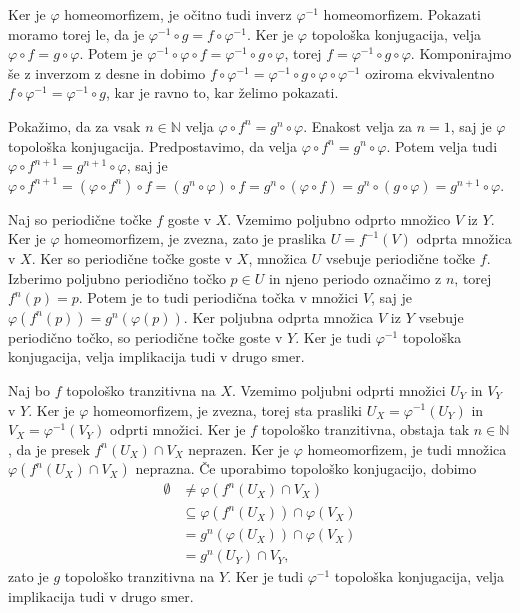 \documentclass{isrmdelo}
\newcommand{\N}{\mathbb N}
\begin{document}
\begin{dokaz}
Ker je $\varphi$ homeomorfizem, je očitno tudi inverz $\varphi^{-1}$ homeomorfizem. Pokazati moramo torej le, da je $\varphi^{-1} \circ g = f \circ \varphi^{-1}$. Ker je $\varphi$ topološka konjugacija, velja $\varphi \circ f = g \circ \varphi$. Potem je $\varphi^{-1} \circ \varphi \circ f = \varphi^{-1} \circ g \circ \varphi$, torej $f=\varphi^{-1} \circ g \circ \varphi$. Komponirajmo še z inverzom z desne in dobimo $f \circ \varphi^{-1} =\varphi^{-1} \circ g \circ \varphi \circ \varphi^{-1}$ oziroma ekvivalentno $f \circ \varphi^{-1} =\varphi^{-1} \circ g$, kar je ravno to, kar želimo pokazati.

\smallskip

Pokažimo, da za vsak $n \in \N$ velja $\varphi \circ f^n = g^n \circ \varphi$. Enakost velja za $n=1$, saj je $\varphi$ topološka konjugacija. Predpostavimo, da velja $\varphi \circ f^n = g^n \circ \varphi$. Potem velja tudi $\varphi \circ f^{n+1} = g^{n+1} \circ \varphi$, saj je $\varphi \circ f^{n+1} = (\varphi \circ f^n) \circ f = (g^n \circ \varphi) \circ f = g^n \circ (\varphi \circ f) = g^n \circ (g \circ \varphi) = g^{n+1} \circ \varphi.$

\smallskip

Naj so periodične točke $f$ goste v $X$. Vzemimo poljubno odprto množico $V$ iz $Y$. Ker je $\varphi$ homeomorfizem, je zvezna, zato je praslika $U=f^{-1}(V)$ odprta množica v $X$. Ker so periodične točke goste v $X$, množica $U$ vsebuje periodične točke $f$. Izberimo poljubno periodično točko $p \in U$ in njeno periodo označimo z $n$, torej $f^n(p) = p$. Potem je to tudi periodična točka v množici $V$, saj je $\varphi(f^n(p)) = g^n(\varphi(p))$. Ker poljubna odprta množica $V$ iz $Y$ vsebuje periodično točko, so periodične točke goste v $Y$. Ker je tudi $\varphi^{-1}$ topološka konjugacija, velja implikacija tudi v drugo smer.

\smallskip

Naj bo $f$ topološko tranzitivna na $X$. Vzemimo poljubni odprti množici $U_Y$ in $V_Y$ v $Y$. Ker je $\varphi$ homeomorfizem, je zvezna, torej sta prasliki $U_X = \varphi^{-1}(U_Y)$ in $V_X = \varphi^{-1}(V_Y)$ odprti množici. Ker je $f$ topološko tranzitivna, obstaja tak $n \in \N$, da je presek $f^n(U_X) \cap V_X$ neprazen. Ker je $\varphi$ homeomorfizem, je tudi množica $\varphi(f^n(U_X) \cap V_X)$ neprazna. Če uporabimo topološko konjugacijo, dobimo
\begin{align*}
    \emptyset &\neq \varphi(f^n(U_X) \cap V_X) \\
    &\subseteq \varphi(f^n(U_X)) \cap \varphi(V_X) \\
    &= g^n(\varphi(U_X)) \cap \varphi(V_X) \\
    &= g^n(U_Y) \cap V_Y,
\end{align*}
zato je $g$ topološko tranzitivna na $Y$. Ker je tudi $\varphi^{-1}$ topološka konjugacija, velja implikacija tudi v drugo smer. \qedhere
\end{dokaz}
\end{document}
